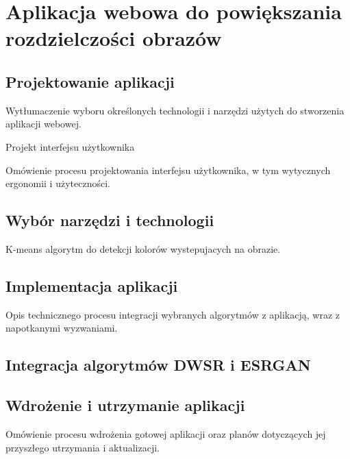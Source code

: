 \chapter{Aplikacja webowa do powiększania rozdzielczości obrazów}


\section{Projektowanie aplikacji}


Wytłumaczenie wyboru określonych technologii i narzędzi użytych do stworzenia aplikacji webowej.


Projekt interfejsu użytkownika


Omówienie procesu projektowania interfejsu użytkownika, w tym wytycznych ergonomii i użyteczności.



\section{Wybór narzędzi i technologii}

K-means algorytm do detekcji kolorów wystepujacych na obrazie.


\section{Implementacja aplikacji}


Opis technicznego procesu integracji wybranych algorytmów z aplikacją, wraz z napotkanymi wyzwaniami.

\section{Integracja algorytmów DWSR i ESRGAN}


\section{Wdrożenie i utrzymanie aplikacji}

Omówienie procesu wdrożenia gotowej aplikacji oraz planów dotyczących jej przyszłego utrzymania i aktualizacji.
